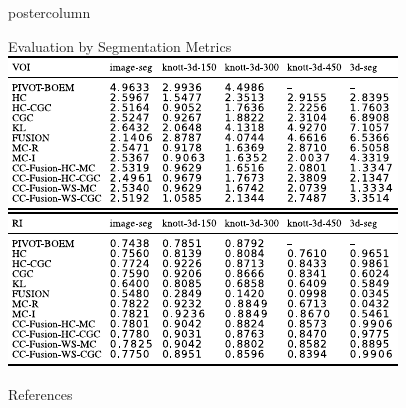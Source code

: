 \documentclass[final,hyperref={pdfpagelabels=false}]{beamer}
\begin{document}
\begin{frame}
\begin{columns}
\begin{column}{.49\textwidth}
\begin{beamercolorbox}[center,wd=\textwidth]{postercolumn}
\begin{minipage}[T]{.95\textwidth}
{\begin{block}{Evaluation by Segmentation Metrics}
              \centering
              \includegraphics[width=0.7\linewidth]{virib.pdf}            
            \end{block}
            \vfill
            \vfill
            \begin{block}{References}
                \begin{multicols}{2}
                \footnotesize
                
                
                \end{multicols}
            \end{block}
            \vfill
          }
        \end{minipage}
      \end{beamercolorbox}

\end{column}
\end{columns}
\end{frame}
\end{document}
